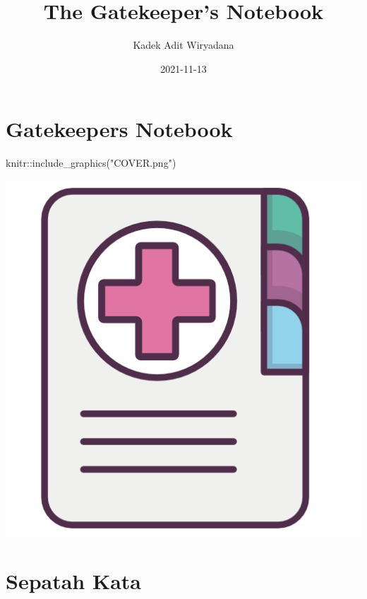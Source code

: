 \documentclass[
]{book}
\title{The Gatekeeper's Notebook}
\author{Kadek Adit Wiryadana}
\date{2021-11-13}
\newenvironment{Shaded}{\begin{snugshade}}{\end{snugshade}}
\newcommand{\FunctionTok}[1]{\textcolor[rgb]{0.00,0.00,0.00}{#1}}
\newcommand{\NormalTok}[1]{#1}
\newcommand{\SpecialCharTok}[1]{\textcolor[rgb]{0.00,0.00,0.00}{#1}}
\newcommand{\StringTok}[1]{\textcolor[rgb]{0.31,0.60,0.02}{#1}}
\begin{document}
\maketitle

{
\setcounter{tocdepth}{1}
\tableofcontents
}
\hypertarget{gatekeepers-notebook}{%
\chapter{Gatekeepers Notebook}\label{gatekeepers-notebook}}

\begin{Shaded}
\begin{Highlighting}[]
\NormalTok{knitr}\SpecialCharTok{::}\FunctionTok{include\_graphics}\NormalTok{(}\StringTok{"COVER.png"}\NormalTok{)}
\end{Highlighting}
\end{Shaded}

\begin{center}\includegraphics[width=7.11in]{COVER} \end{center}

\hypertarget{sepatah-kata}{%
\chapter{Sepatah Kata}\label{sepatah-kata}}
\end{document}
